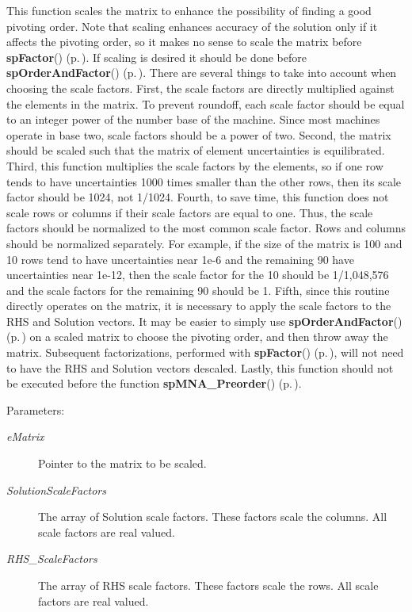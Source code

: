 This function scales the matrix to enhance the possibility of finding a good pivoting order. Note that scaling enhances accuracy of the solution only if it affects the pivoting order, so it makes no sense to scale the matrix before {\bf sp\-Factor}() {\rm (p.\,\pageref{spFactor_8c_a25})}. If scaling is desired it should be done before {\bf sp\-Order\-And\-Factor}() {\rm (p.\,\pageref{spFactor_8c_a24})}. There are several things to take into account when choosing the scale factors. First, the scale factors are directly multiplied against the elements in the matrix. To prevent roundoff, each scale factor should be equal to an integer power of the number base of the machine. Since most machines operate in base two, scale factors should be a power of two. Second, the matrix should be scaled such that the matrix of element uncertainties is equilibrated. Third, this function multiplies the scale factors by the elements, so if one row tends to have uncertainties 1000 times smaller than the other rows, then its scale factor should be 1024, not 1/1024. Fourth, to save time, this function does not scale rows or columns if their scale factors are equal to one. Thus, the scale factors should be normalized to the most common scale factor. Rows and columns should be normalized separately. For example, if the size of the matrix is 100 and 10 rows tend to have uncertainties near 1e-6 and the remaining 90 have uncertainties near 1e-12, then the scale factor for the 10 should be 1/1,048,576 and the scale factors for the remaining 90 should be 1. Fifth, since this routine directly operates on the matrix, it is necessary to apply the scale factors to the RHS and Solution vectors. It may be easier to simply use {\bf sp\-Order\-And\-Factor}() {\rm (p.\,\pageref{spFactor_8c_a24})} on a scaled matrix to choose the pivoting order, and then throw away the matrix. Subsequent factorizations, performed with {\bf sp\-Factor}() {\rm (p.\,\pageref{spFactor_8c_a25})}, will not need to have the RHS and Solution vectors descaled. Lastly, this function should not be executed before the function {\bf sp\-MNA\_\-Preorder}() {\rm (p.\,\pageref{spUtils_8c_a11})}.\begin{Desc}
\item[Parameters: ]\par
\begin{description}
\item[{\em 
e\-Matrix}]Pointer to the matrix to be scaled. \item[{\em 
Solution\-Scale\-Factors}]The array of Solution scale factors. These factors scale the columns. All scale factors are real valued. \item[{\em 
RHS\_\-Scale\-Factors}]The array of RHS scale factors. These factors scale the rows. All scale factors are real valued. \end{description}
\end{Desc}
